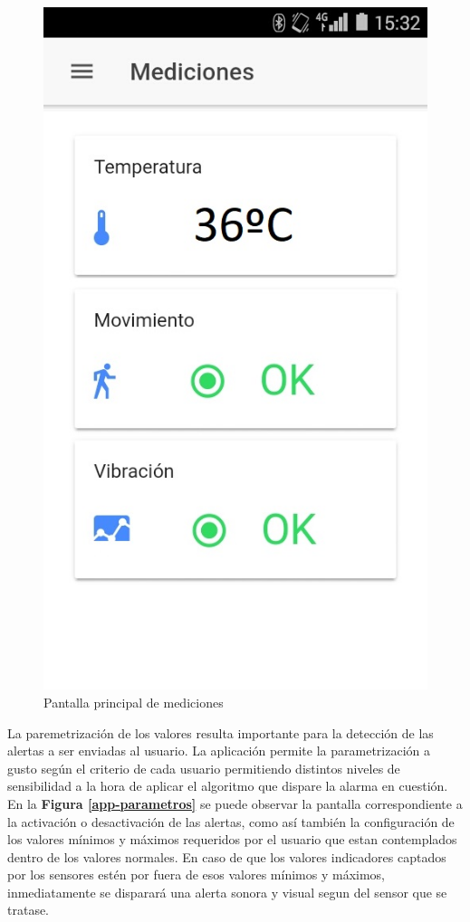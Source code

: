 \documentclass{IEEEtran}
\begin{document}
			\begin{figure}
				\centering
				\includegraphics[width=0.5\linewidth]{app-mediciones}
				\caption{Pantalla principal de mediciones}
				\label{app-mediciones}
			\end{figure}

			La paremetrización de los valores resulta importante para la detección de las alertas a ser enviadas al usuario. La aplicación permite la parametrización a gusto según el criterio de cada usuario permitiendo distintos niveles de sensibilidad a la hora de aplicar el algoritmo que dispare la alarma en cuestión. En la \textbf{Figura \ref{app-parametros}} se puede observar la pantalla correspondiente a la activación o desactivación de las alertas, como así también la configuración de los valores mínimos y máximos requeridos por el usuario que estan contemplados dentro de los valores normales. En caso de que los valores indicadores captados por los sensores estén por fuera de esos valores mínimos y máximos, inmediatamente se disparará una alerta sonora y visual segun del sensor que se tratase.
\end{document}

